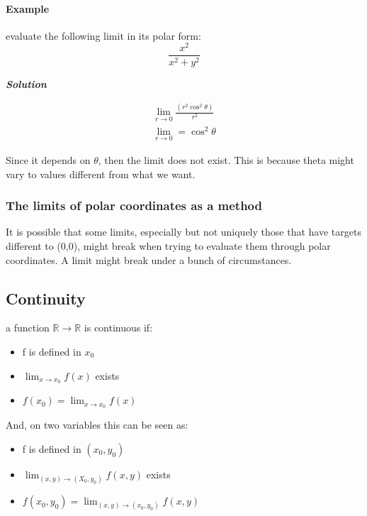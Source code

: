 \documentclass[11pt,fleqn]{book} %
\begin{document}
\paragraph{Example}

evaluate the following limit in its polar form: $$\frac{x^2}{x^2+y^2}$$

\textit{\textbf{Solution}}

\begin{gather}
    \lim_{r \to 0} \frac{(r^2 \cos^2{\theta})}{r^2}\\
    \lim_{r \to 0} = \cos^2{\theta} 
\end{gather}

Since it depends on $\theta$, then the limit does not exist. This is because theta might vary to values different from
what we want. 

\subsubsection{The limits of polar coordinates as a method}

It is possible that some limits, especially but not uniquely those that have targets different to (0,0), might break when trying to 
evaluate them through polar coordinates. A limit might break under a bunch of circumstances. 

\subsection{Continuity}

a function $\mathbb{R} \to \mathbb{R}$ is continuous if:

\begin{itemize}
    \item f is defined in $x_0$
    \item $\lim_{x \to x_0} f(x)$ exists
    \item $ f(x_0) = \lim_{x \to x_0} f(x) $
\end{itemize}

And, on two variables this can be seen as:

\begin{itemize}
    \item f is defined in $(x_0, y_0)$
    \item $\lim_{(x,y) \to (X_0, y_0)} f(x,y)$ exists
    \item $ f(x_0,y_0) = \lim_{(x,y) \to (x_0, y_0)} f(x,y) $
\end{itemize}
\end{document}
